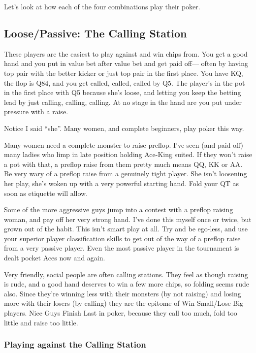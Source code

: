 Let's look at how each of the four combinations play their poker.

\subsection{Loose/Passive: The Calling Station}

These players are the easiest to play against and win chips from.
You get a good hand and you put in value bet after value bet and
get paid off--- often by having top pair with the better kicker or
just top pair in the first place. You have KQ, the flop is Q84, and
you get called, called, called by Q5. The player's in the pot in the
first place with Q5 because she's loose, and letting you keep the
betting lead by just calling, calling, calling. At no stage in
the hand are you put under pressure with a raise.

Notice I said ``she''. Many women, and complete beginners,
play poker this way.

Many women need a complete monster to raise preflop. I've seen
(and paid off) many ladies who limp in late position holding
Ace-King suited. If they won't raise a pot with that, a preflop
raise from them pretty much means QQ, KK or AA. Be very wary
of a preflop raise from a genuinely tight player. She isn't
loosening her play, she's woken up with a very powerful starting
hand. Fold your QT as soon as etiquette will allow.

Some of the more aggressive guys jump into a contest with a
preflop raising woman, and pay off her very strong hand. I've
done this myself once or twice, but grown out of the habit. This
isn't smart play at all. Try and be ego-less, and use your
superior player classification skills to get out of the way
of a preflop raise from a very passive player. Even the most
passive player in the tournament is dealt pocket Aces now and
again.

Very friendly, social people are often calling stations.
They feel as though raising is rude, and a good hand deserves
to win a few more chips, so folding seems rude also. Since
they're winning less with their monsters (by not raising)
and losing more with their losers (by calling) they are
the epitome of Win Small/Lose Big players. Nice Guys
Finish Last in poker, because they call too much, fold
too little and raise too little.

\subsubsection{Playing against the Calling Station}

